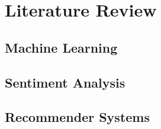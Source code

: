 \chapter{Literature Review}

\section{Machine Learning}
\section{Sentiment Analysis}
\section{Recommender Systems}